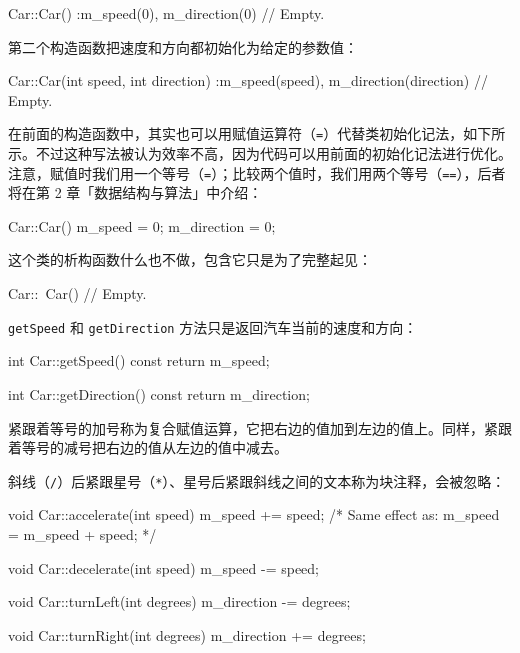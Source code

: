 \begin{codebox}
Car::Car()
  :m_speed(0),
   m_direction(0) {
  // Empty.
}
\end{codebox}

第二个构造函数把速度和方向都初始化为给定的参数值：

\begin{codebox}
Car::Car(int speed, int direction)
  :m_speed(speed),
   m_direction(direction) {
  // Empty.
}
\end{codebox}

在前面的构造函数中，其实也可以用赋值运算符（\texttt{=}）代替类初始化记法，如下所示。不过这种写法被认为效率不高，因为代码可以用前面的初始化记法进行优化。注意，赋值时我们用一个等号（\texttt{=}）；比较两个值时，我们用两个等号（\texttt{==}），后者将在第 2 章「数据结构与算法」中介绍：

\begin{codebox}
Car::Car() {
  m_speed = 0;
  m_direction = 0;
}
\end{codebox}

这个类的析构函数什么也不做，包含它只是为了完整起见：

\begin{codebox}
Car::~Car() {
  // Empty.
}
\end{codebox}

\texttt{getSpeed} 和 \texttt{getDirection} 方法只是返回汽车当前的速度和方向：

\begin{codebox}
int Car::getSpeed() const {
  return m_speed;
}

int Car::getDirection() const {
  return m_direction;
}
\end{codebox}

紧跟着等号的加号称为复合赋值运算，它把右边的值加到左边的值上。同样，紧跟着等号的减号把右边的值从左边的值中减去。

斜线（\texttt{/}）后紧跟星号（\texttt{*}）、星号后紧跟斜线之间的文本称为块注释，会被忽略：

\begin{codebox}
void Car::accelerate(int speed) {
  m_speed += speed; /* Same effect as: m_speed = m_speed + speed;
*/
}

void Car::decelerate(int speed) {
  m_speed -= speed;
}

void Car::turnLeft(int degrees) {
  m_direction -= degrees;
}

void Car::turnRight(int degrees) {
  m_direction += degrees;
}
\end{codebox}


